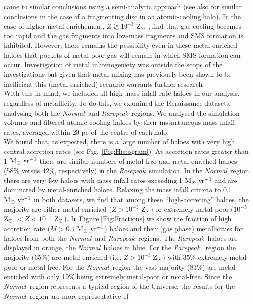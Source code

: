 \documentclass[graphics, twocolumn, usenatbib]{mn2e}
\newcommand{\msolaryr} {$\rm{M_{\odot}~yr^{-1}}~$}
\newcommand{\msolaryrc} {$\rm{M_{\odot}~yr^{-1}}$}
\newcommand{\zsolar} {$\rm{Z_{\odot}}~$}
\newcommand{\zsolarc} {$\rm{Z_{\odot}}$}
\newcommand{\rarepeak} {\textit{Rarepeak~}}
\newcommand{\normal} {\textit{Normal~}}
\begin{document}
\cite{Tagawa_2020} came to similar conclusions
using a semi-analytic approach (see also \citealt{Inayoshi_2014b} for similar conclusions in the case of a fragmenting disc in an atomic-cooling halo).
In the case of higher metal enrichement,  $Z \gtrsim 10^{-3}$ \zsolar,
\citet{Chon_2020} find that gas cooling becomes too rapid and the gas fragments into low-mass fragments
and SMS formation is inhibited. However, there remains the possibility even in these
metal-enriched haloes that pockets of metal-poor gas will remain in which SMS formation can occur.
Investigation of metal inhomogeniety was outside the scope of the \cite{Chon_2020} investigations
but given that metal-mixing has previously been shown to be inefficient
\citep[e.g.][]{Smith_2015} this (metal-enriched) scenario warrants further research. \\
\indent With this in mind, we included all high mass infall-rate haloes in our analysis, regardless of
metallicity. To do this, we examined the Renaissance datasets, analysing
both the \normal and \rarepeak regions. We analysed the simulation volumes and filtered atomic
cooling haloes by their instantaneous mass infall rates, averaged within 20 pc of the centre of each halo.  \\
\indent We found that, as expected, there is a large number of haloes with very high central accretion rates (see Fig.~\ref{Fig:Histogram}). At accretion rates
greater than 1 \msolaryr there are similar numbers of metal-free and metal-enriched haloes
(58\% versus 42\%, respectively) in the \rarepeak simulation. In the \normal region there are very few haloes with mass
infall rates exceeding 1 \msolaryr and are dominated by metal-enriched haloes. Relaxing the
mass infall criteria to 0.1 \msolaryr in both datasets, we find that among these ``high-accreting''
haloes, the majority are either metal-enriched ($Z > 10^{-3}$ \zsolarc) or
extremely metal-poor ($10^{-5}$ \zsolar $ < Z < 10^{-3}$ \zsolarc). In Figure \ref{Fig:Fractions}
we show the fraction of high accretion rate ($\dot{M} > 0.1$ \msolaryrc) haloes and
their (gas phase) metallicities for haloes from both the \normal and \rarepeak regions.
The \rarepeak haloes are displayed in orange, the \normal haloes in blue. For the \rarepeak
region the majority (65\%) are metal-enriched (i.e. $Z > 10^{-3}$ \zsolarc) with 35\% extremely
metal-poor or metal-free. For the \normal region the vast
majority (81\%) are metal enriched with only 19\% being extremely metal-poor or metal-free.
Since the \normal region represents a typical
region of the Universe, the results for the \normal region are more representative of 
\end{document}
